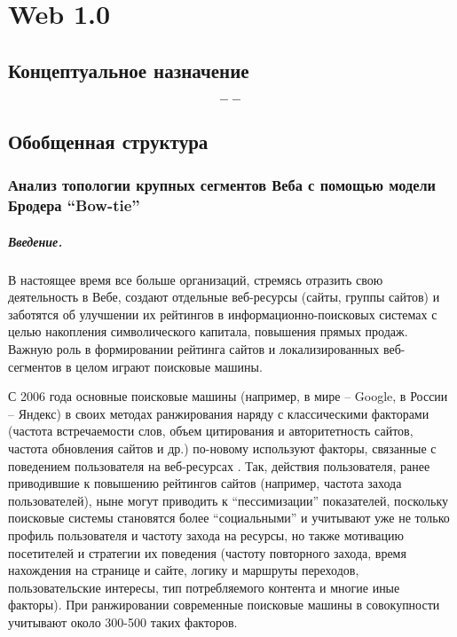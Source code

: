 \chapter{Web 1.0}\label{ch:ch1}

\section{Концептуальное назначение}\label{sec:ch1/sec1}

\[
--
\]

\section{Обобщенная структура}\label{sec:ch1/sec2}

\subsection{Анализ топологии крупных сегментов Веба с помощью модели Бродера “Bow-tie”}\label{subsec:ch1/sec2/sub1}

\paragraph{Введение.} В настоящее время все больше организаций, стремясь отразить свою деятельность в Вебе, создают отдельные веб-ресурсы (сайты, группы сайтов) и заботятся об улучшении их рейтингов в информационно-поисковых системах с целью накопления символического капитала, повышения прямых продаж. Важную роль в формировании рейтинга сайтов и локализированных веб-сегментов в целом играют поисковые машины.

С 2006 года основные поисковые машины (например, в мире -- Google, в России -- Яндекс) в своих методах ранжирования наряду с классическими факторами \cite{Kleinberg, BrinPage, Chakrabarti} (частота встречаемости слов, объем цитирования и авторитетность сайтов, частота обновления сайтов и др.) по-новому используют факторы, связанные с поведением пользователя на веб-ресурсах \cite{GuhaKunduBhadra,AntoniouPlegasTsakalidis,FeuerSavevAslam}. Так, действия пользователя, ранее приводившие к повышению рейтингов сайтов (например, частота захода пользователей), ныне могут приводить к “пессимизации” показателей, поскольку поисковые системы становятся более “социальными” и учитывают уже не только профиль пользователя и частоту захода на ресурсы, но также мотивацию посетителей и стратегии их поведения (частоту повторного захода, время нахождения на странице и сайте, логику и маршруты переходов, пользовательские интересы, тип потребляемого контента и многие иные факторы). При ранжировании современные поисковые машины в совокупности учитывают около 300-500 таких факторов.

